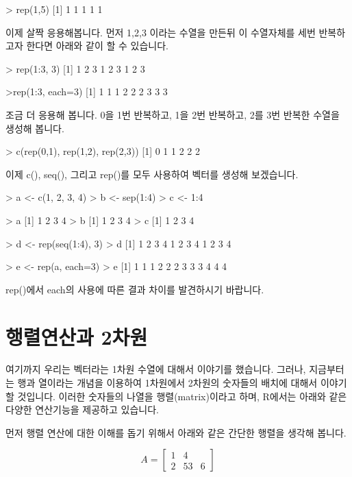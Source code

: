 \documentclass{book}
\begin{document}
\begin{Schunk}
\begin{Soutput}
> rep(1,5)
[1] 1 1 1 1 1
\end{Soutput}
\end{Schunk}

이제 살짝 응용해봅니다.  
먼저 1,2,3 이라는 수열을 만든뒤 이 수열자체를 세번 반복하고자 한다면 아래와 같이 할 수 있습니다. 

\begin{Schunk}
\begin{Soutput}
> rep(1:3, 3)
[1] 1 2 3 1 2 3 1 2 3	
\end{Soutput}
\end{Schunk}
>rep(1:3, each=3)
[1] 1 1 1 2 2 2 3 3 3

조금 더 응용해 봅니다. 
0을 1번 반복하고, 1을 2번 반복하고, 2를 3번 반복한 수열을 생성해 봅니다. 

\begin{Schunk}
\begin{Soutput}
> c(rep(0,1), rep(1,2), rep(2,3))
[1] 0 1 1 2 2 2
\end{Soutput}
\end{Schunk}

이제 c(), seq(), 그리고 rep()를 모두 사용하여 벡터를 생성해 보겠습니다.

> a <- c(1, 2, 3, 4)
> b <- sep(1:4)
> c <- 1:4

> a
[1] 1 2 3 4
> b
[1] 1 2 3 4
> c
[1] 1 2 3 4

> d <- rep(seq(1:4), 3)
> d
[1] 1 2 3 4 1 2 3 4 1 2 3 4

> e <- rep(a, each=3)
> e
[1] 1 1 1 2 2 2 3 3 3 4 4 4

rep()에서 each의 사용에 따른 결과 차이를 발견하시기 바랍니다.

\section{행렬연산과 2차원}

여기까지 우리는 벡터라는 1차원 수열에 대해서 이야기를 했습니다. 
그러나, 지금부터는 행과 열이라는 개념을 이용하여 1차원에서 2차원의 숫자들의 배치에 대해서 이야기 할 것입니다. 
이러한 숫자들의 나열을 행렬(matrix)이라고 하며, R에서는 아래와 같은 다양한 연산기능을 제공하고 있습니다. 

먼저 행렬 연산에 대한 이해를 돕기 위해서 아래와 같은 간단한 행렬을 생각해 봅니다. 

\begin{equation}
A = 
\begin{bmatrix}
1 & 4 \\
2 & 5 
3 & 6
\end{bmatrix}
\end{equation}
\end{document}

